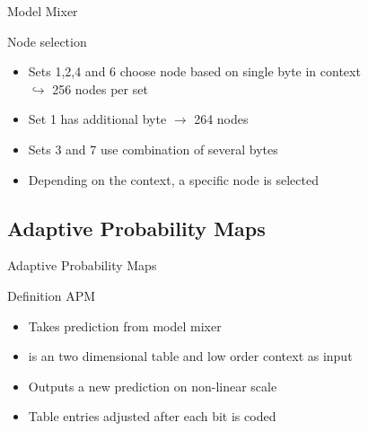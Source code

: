 \documentclass[11pt,usenames,dvipsnames]{beamer}
\begin{document}
\begin{frame}{Model Mixer}
	\begin{block}{Node selection}
		\begin{itemize}
			\item Sets 1,2,4 and 6 choose node based on single byte in context\\
			$\hookrightarrow$ 256 nodes per set
			\item Set 1 has additional byte $\rightarrow$ 264 nodes
			\item Sets 3 and 7 use combination of several bytes
			\item Depending on the context, a specific node is selected
		\end{itemize}
	\end{block}
	
\end{frame}


\subsection{Adaptive Probability Maps}
\begin{frame}{Adaptive Probability Maps}
	\begin{alertblock}{Definition APM}
		\begin{itemize}
			\item Takes prediction from model mixer
			\item is an two dimensional table and low order context as input
			\item Outputs a new prediction on non-linear scale
			\item Table entries adjusted after each bit is coded
		\end{itemize}
	\end{alertblock}

\end{frame}
\end{document}
